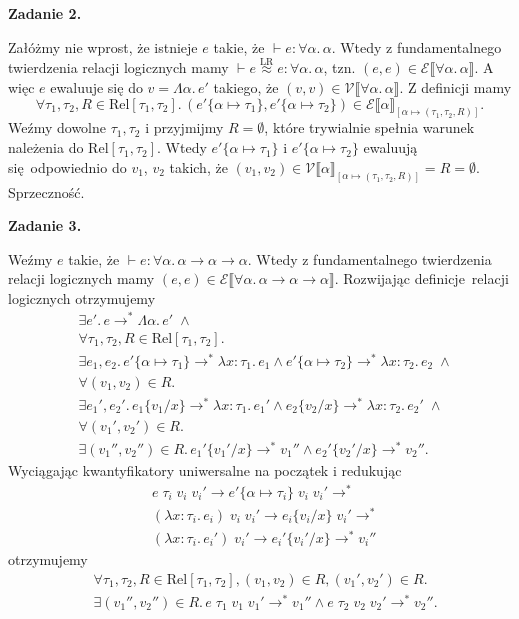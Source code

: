 \documentclass[a4paper, 12pt]{article}
\title{}
\author{Wiktor Kuchta}
\date{\vspace{-4ex}}
\newcommand{\Rel}{\mathrm{Rel}}
\newcommand{\E}{\mathcal{E}}
\newcommand{\V}{\mathcal{V}}
\newcommand{\LReq}{\stackrel{\mathrm{LR}}{≈}}
\begin{document}
\maketitle

{\bf Zadanie 2.}

Załóżmy nie wprost, że istnieje $e$ takie, że $⊢ e : ∀α.\,α$.
Wtedy z fundamentalnego twierdzenia relacji logicznych mamy
$⊢ e \LReq e : ∀α.\,α$, tzn. $(e,e) ∈ \E⟦∀α.\,α⟧$.
A więc $e$ ewaluuje się do $v=Λα.\,e'$ takiego, że $(v,v) ∈ \V⟦∀α.\,α⟧$.
Z definicji mamy
$$∀τ_1,τ_2,R∈\Rel[τ_1,τ_2].\,(e'\{α↦τ_1\},e'\{α↦τ_2\})∈\E⟦α⟧_{[α↦(τ_1,τ_2,R)]}.$$
Weźmy dowolne $τ_1,τ_2$ i
przyjmijmy $R=∅$, które trywialnie spełnia warunek należenia do $\Rel[τ_1,τ_2]$.
Wtedy $e'\{α↦τ_1\}$ i $e'\{α↦τ_2\}$ ewaluują się odpowiednio do $v_1$, $v_2$ takich, że
$(v_1,v_2) ∈ \V⟦α⟧_{[α↦(τ_1,τ_2,R)]} = R = ∅$.
Sprzeczność.

{\bf Zadanie 3.}

Weźmy $e$ takie, że $⊢ e : ∀α.\,α → α → α$.
Wtedy z fundamentalnego twierdzenia relacji logicznych mamy
$(e,e) ∈ \E⟦∀α.\,α→α→α⟧$.
Rozwijając definicje relacji logicznych otrzymujemy
\begin{align*}
	&∃e'.\,e →^* Λα.\,e' \; ∧ \\
	&∀τ_1, τ_2, R ∈ \Rel[τ_1,τ_2].\\
	&∃e_1, e_2.\, e'\{α↦τ_1\} →^* λx:τ_1.\,e_1 ∧ e'\{α↦τ_2\} →^* λx:τ_2.\,e_2 \; ∧ \\
	&∀(v_1,v_2) ∈ R.\\
	&∃e_1', e_2'.\, e_1\{v_1/x\} →^* λx:τ_1.\,e_1' ∧ e_2\{v_2/x\} →^* λx:τ_2.\,e_2' \; ∧ \\
	&∀(v_1',v_2') ∈ R.\\
	&∃(v_1'', v_2'') ∈ R.\, e_1'\{v_1'/x\} →^* v_1'' ∧ e_2'\{v_2'/x\} →^* v_2''.
\end{align*}
Wyciągając kwantyfikatory uniwersalne na początek i redukując
\begin{align*}
	&e\;τ_i\;v_i\;v_i' → e'\{α↦τ_i\}\;v_i\;v_i' → ^* \\
	&(λx:τ_i.\,e_i)\;v_i\;v_i' → e_i\{v_i/x\}\;v_i' → ^* \\
	&(λx:τ_i.\,e_i')\;v_i' → e_i'\{v_i'/x\} →^* v_i''
\end{align*}
otrzymujemy
\begin{align*}
&∀τ_1,τ_2,R∈\Rel[τ_1,τ_2],(v_1,v_2)∈R,(v_1',v_2')∈R.\, \\
&∃(v_1'',v_2'')∈R.\,
e\;τ_1\;v_1\;v_1' →^* v_1'' ∧ e\;τ_2\;v_2\;v_2' →^* v_2''.
\end{align*}
\end{document}
